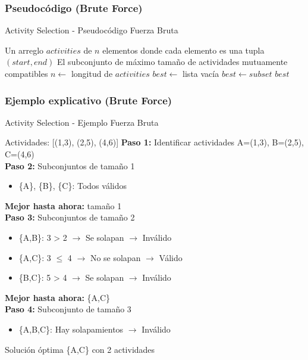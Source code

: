 \documentclass[aspectratio=169]{beamer}
\renewcommand{\algorithmicrequire}{\textbf{Entrada:}}
\renewcommand{\algorithmicensure}{\textbf{Salida:}}
\newcommand{\REQUIRE}{\State[\algorithmicrequire]}
\newcommand{\ENSURE}{\State[\algorithmicensure]}
\begin{document}
\subsubsection{Pseudocódigo (Brute Force)}
\begin{frame}[fragile]{Activity Selection - Pseudocódigo Fuerza Bruta}
\scriptsize
\begin{algorithmic}[1]
\REQUIRE Un arreglo $activities$ de $n$ elementos donde cada elemento es una tupla $(start, end)$
\ENSURE El subconjunto de máximo tamaño de actividades mutuamente compatibles
\State $n \leftarrow$ longitud de $activities$ 
\State $best \leftarrow$ lista vacía 
         
            \State $best \leftarrow subset$ 
        \EndIf
    \EndFor
\EndFor
\Return $best$
\end{algorithmic}
\normalsize
\end{frame}

\subsubsection{Ejemplo explicativo (Brute Force)}
\begin{frame}[allowframebreaks]{Activity Selection - Ejemplo Fuerza Bruta}
\begin{exampleblock}{Actividades: [(1,3), (2,5), (4,6)]}
\textbf{Paso 1:} Identificar actividades A=(1,3), B=(2,5), C=(4,6)
\\
\textbf{Paso 2:} Subconjuntos de tamaño 1
\begin{itemize}
    \item \{A\}, \{B\}, \{C\}: Todos válidos
\end{itemize}
\textbf{Mejor hasta ahora:} tamaño 1
\\
\textbf{Paso 3:} Subconjuntos de tamaño 2
\begin{itemize}
    \item \{A,B\}: 3 > 2 $\rightarrow$ Se solapan $\rightarrow$ Inválido
    \item \{A,C\}: 3 $\le$ 4 $\rightarrow$ No se solapan $\rightarrow$ Válido
    \item \{B,C\}: 5 > 4 $\rightarrow$ Se solapan $\rightarrow$ Inválido
\end{itemize}
\textbf{Mejor hasta ahora:} \{A,C\}
\\
\textbf{Paso 4:} Subconjunto de tamaño 3
\begin{itemize}
    \item \{A,B,C\}: Hay solapamientos $\rightarrow$ Inválido
\end{itemize}
\end{exampleblock}

\begin{block}{Solución óptima}
\{A,C\} con 2 actividades
\end{block}
\end{frame}
\end{document}
